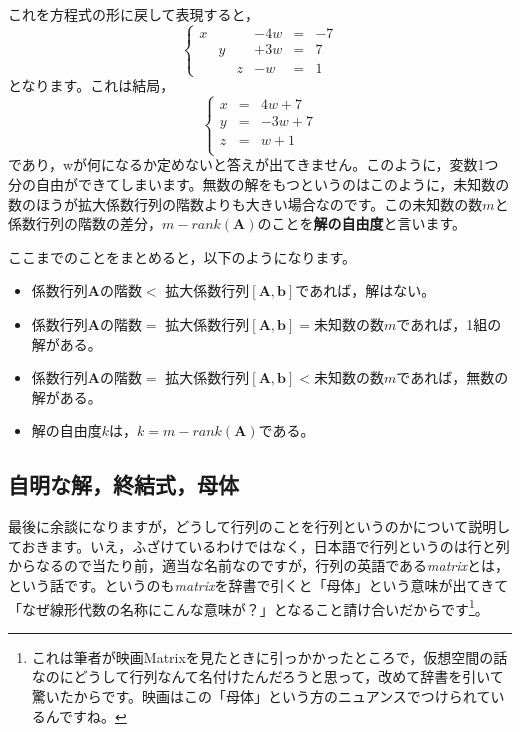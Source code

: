 \documentclass{ltjsbook}
\begin{document}
これを方程式の形に戻して表現すると，
\[
	\left \{
	\begin{array}{cccccc}
		x &   &   & -4w & = & -7 \\
		  & y &   & +3w & = & 7  \\
		  &   & z & -w  & = & 1
	\end{array}
	\right .
\]
となります。これは結局，
\[
	\left \{
	\begin{array}{ccc}
		x & = & 4w + 7  \\
		y & = & -3w + 7 \\
		z & = & w + 1   \\
	\end{array}
	\right .
\]
であり，wが何になるか定めないと答えが出てきません。このように，変数1つ分の自由ができてしまいます。無数の解をもつというのはこのように，未知数の数のほうが拡大係数行列の階数よりも大きい場合なのです。この未知数の数$m$と係数行列の階数の差分，$m - rank(\bm{A})$のことを\textbf{解の自由度}と言います。

ここまでのことをまとめると，以下のようになります。\label{StairAndRank2}
\begin{itemize}
	\item 係数行列$\bm{A}$の階数$<$ 拡大係数行列$[\bm{A},\bm{b}]$であれば，解はない。
	\item 係数行列$\bm{A}$の階数$=$ 拡大係数行列$[\bm{A},\bm{b}]=$未知数の数$m$であれば，1組の解がある。
	\item 係数行列$\bm{A}$の階数$=$ 拡大係数行列$[\bm{A},\bm{b}]<$未知数の数$m$であれば，無数の解がある。
	\item 解の自由度$k$は，$k = m - rank(\bm{A})$である。
\end{itemize}




\subsection{自明な解，終結式，母体}
最後に余談になりますが，どうして行列のことを行列というのかについて説明しておきます。いえ，ふざけているわけではなく，日本語で行列というのは行と列からなるので当たり前，適当な名前なのですが，行列の英語である\textit{matrix}とは，という話です。というのも\textit{matrix}を辞書で引くと「母体」という意味が出てきて「なぜ線形代数の名称にこんな意味が？」となること請け合いだからです\footnote{これは筆者が映画Matrixを見たときに引っかかったところで，仮想空間の話なのにどうして行列なんて名付けたんだろうと思って，改めて辞書を引いて驚いたからです。映画はこの「母体」という方のニュアンスでつけられているんですね。}。
\end{document}
